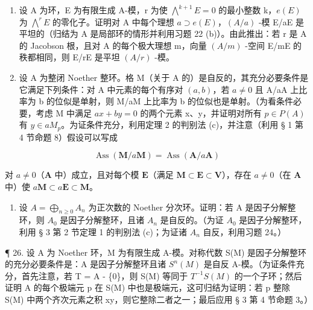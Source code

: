 \begin{enumerate}
\def\labelenumi{\arabic{enumi}.}
\setcounter{enumi}{22}
\item
  设 A 为环，E 为有限生成 A-模，r 为使 \(\bigwedge^{k+1}E=0\) 的最小整数 k，\(e(E)\) 为 \(\bigwedge^{r}E\) 的零化子。证明对 A 中每个理想 \(a\supset e(E)\)，\((A/a)\) -模 E/aE 是平坦的（归结为 A 是局部环的情形并利用习题 22 (b)）。由此推出：若 r 是 A 的 Jacobson 根，且对 A 的每个极大理想 m，向量 \((A/m)\) -空间 E/mE 的秩都相同，则 E/rE 是平坦 \((A/r)\) -模。
\item
  设 A 为整闭 Noether 整环。格 M（关于 A 的）是自反的，其充分必要条件是它满足下列条件：对 A 中元素的每个有序对 \((a, b)\)，若 \(a \neq 0\) 且 A/aA 上比率为 b 的位似是单射，则 M/aM 上比率为 b 的位似也是单射。（为看条件必要，考虑 M 中满足 \(ax + by = 0\) 的两个元素 x、y，并证明对所有 \(p \in P(A)\) 有 \(y \in aM_{p}\)。为证条件充分，利用定理 2 的判别法 (c)，并注意（利用 § 1 第 4 节命题 8）假设可以写成
\end{enumerate}

\[
\operatorname{Ass} (\mathbf {M} / a \mathbf {M}) = \operatorname{Ass} (\mathbf {A} / a \mathbf {A})
\]

对 \(a \neq 0\)（\(\mathbf{A}\) 中）成立，且对每个模 \(\mathbf{E}\)（满足 \(\mathbf{M} \subset \mathbf{E} \subset \mathbf{V}\)），存在 \(a \neq 0\)（在 \(\mathbf{A}\) 中）使 \(a\mathbf{M} \subset a\mathbf{E} \subset \mathbf{M}\)。

\begin{enumerate}
\def\labelenumi{\arabic{enumi}.}
\setcounter{enumi}{24}
\tightlist
\item
  设 \(A = \bigoplus_{n \geq 0} A_n\) 为正次数的 Noether 分次环。证明：若 A 是因子分解整环，则 \(A_0\) 是因子分解整环，且诸 \(A_n\) 是自反的。（为证 \(A_0\) 是因子分解整环，利用 § 3 第 2 节定理 1 的判别法 (c)；为证诸 \(A_n\) 自反，利用习题 24。）
\end{enumerate}

¶ 26. 设 A 为 Noether 环，M 为有限生成 A-模。对称代数 S(M) 是因子分解整环的充分必要条件是：A 是因子分解整环且诸 \(S^{n}(M)\) 是自反 A-模。（为证条件充分，首先注意，若 T = A - \{0\}，则 S(M) 等同于 \(T^{-1}S(M)\) 的一个子环；然后证明 A 的每个极端元 p 在 S(M) 中也是极端元，这可归结为证明：若 p 整除 S(M) 中两个齐次元素之积 xy，则它整除二者之一；最后应用 § 3 第 4 节命题 3。）

